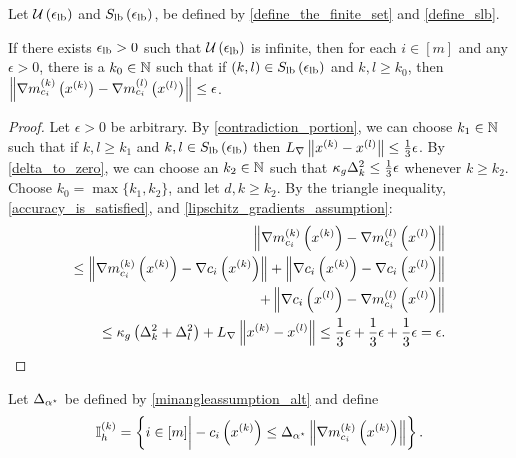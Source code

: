 \begin{lemma}
\label{model_gradients_are_cauchy}
Let ${\mathcal U\left(\epsilon_{\textrm{lb}}\right)}$ and ${S_{\textrm{lb}}\left(\epsilon_{\textrm{lb}}\right)}$, be defined by \cref{define_the_finite_set} and \cref{define_slb}.



If there exists ${\epsilon_{\textrm{lb}}} > 0$ such that ${\mathcal U\left(\epsilon_{\textrm{lb}}\right)}$ is infinite, 
then for each $i \in [m]$ and any $\epsilon > 0$, there is a $k_0 \in \mathbb N$
such that if $(k, l) \in {S_{\textrm{lb}}\left(\epsilon_{\textrm{lb}}\right)}$ and $k, l \ge k_0$, then $\left\|{\nabla m_{c_i}^{(k)}\left(x^{(k)}\right)} - {\nabla m_{c_i}^{(l)}\left({x^{(l)}}\right)} \right\| \le \epsilon$.
\end{lemma}
\begin{proof}
Let $\epsilon > 0$ be arbitrary.
By \cref{contradiction_portion}, we can choose $k_1 \in \mathbb N$ such that if $k, l \ge k_1$ and
$k, l \in {S_{\textrm{lb}}\left(\epsilon_{\textrm{lb}}\right)}$ then ${L_{\nabla}} \left\|x^{(k)} - {x^{(l)}} \right\| \le \frac 1 3 \epsilon$.
By \cref{delta_to_zero}, we can choose an $k_2 \in \mathbb N$ such that $\kappa_g \Delta_k^2 \le \frac 1 3 \epsilon $ whenever $k \ge k_2$.
Choose $k_0 = \max\{k_1, k_2\}$, and let $d, k \ge k_2$.
By the triangle inequality, \cref{accuracy_is_satisfied}, and \cref{lipschitz_gradients_assumption}:
\begin{align*}
\left\|\nabla {{m}^{(k)}_{c_i}}\left(x^{(k)}\right) - \nabla {{m}^{(l)}_{c_i}}\left({x^{(l)}}\right) \right\| \\
\le 
\left\|\nabla {{m}^{(k)}_{c_i}}\left(x^{(k)}\right) - \nabla c_i\left(x^{(k)}\right) \right\|
+ \left\|\nabla c_i\left(x^{(k)}\right) - \nabla c_i\left({x^{(l)}}\right)\right\| \\
+ \left \| \nabla c_i\left({x^{(l)}}\right) - \nabla {{m}^{(l)}_{c_i}}\left({x^{(l)}}\right) \right \| \\
\le \kappa_g \left(\Delta_k^2 + \Delta_l^2\right) + {L_{\nabla}} \left\|x^{(k)} - {x^{(l)}} \right\|
\le \frac 1 3 \epsilon + \frac 1 3 \epsilon + \frac 1 3 \epsilon = \epsilon.
\end{align*}
\end{proof}





Let ${\Delta_{\alpha^{\star}}}$ be defined by \cref{minangleassumption_alt} and define
\begin{align}
{ \mathbb I_h^{(k)} } = \left\{i \in [m] \bigg| -c_i\left(x^{(k)}\right) \le {\Delta_{\alpha^{\star}}} \left\|{\nabla m_{c_i}^{(k)}\left(x^{(k)}\right)}\right\| \right\}. \label{define_activeindicesk}
\end{align}



